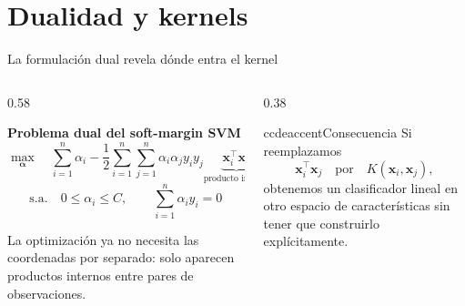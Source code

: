 \section{Dualidad y kernels}

\begin{frame}{La formulación dual revela dónde entra el kernel}
\scriptsize
\begin{columns}[T,onlytextwidth]
\begin{column}{0.58\textwidth}
\begin{ccdebox}
\centering
\textbf{Problema dual del soft-margin SVM}
\[
\max_{\boldsymbol\alpha}
\quad
\sum_{i=1}^{n}\alpha_i
-\frac12\sum_{i=1}^{n}\sum_{j=1}^{n}
\alpha_i\alpha_j y_i y_j
\underbrace{\mathbf x_i^\top\mathbf x_j}_{\text{producto interno}}
\]
\[
\text{s.a.}\quad
0\le \alpha_i\le C,
\qquad
\sum_{i=1}^{n}\alpha_i y_i=0
\]
\end{ccdebox}
\vspace{0.12cm}
\begin{keybox}[fontupper=\footnotesize]
La optimización ya no necesita las coordenadas por separado: solo aparecen productos internos entre pares de observaciones.
\end{keybox}
\end{column}
\begin{column}{0.38\textwidth}
\begin{contrastbox}{ccdeaccent}{Consecuencia}
\footnotesize
Si reemplazamos
\[
\mathbf x_i^\top\mathbf x_j
\quad\text{por}\quad
K(\mathbf x_i,\mathbf x_j),
\]
obtenemos un clasificador lineal en otro espacio de características sin tener que construirlo explícitamente.
\end{contrastbox}
\end{column}
\end{columns}
\end{frame}

